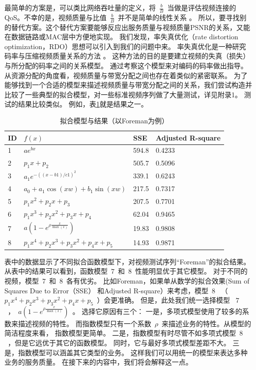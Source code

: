 \begin{enumerate}[(1)]
最简单的方案是，可以类比网络吞吐量的定义，将~$\frac{b}{B}$~当做是评估视频连接的QoS。不幸的是，视频质量与比值~$\frac{b}{B}$~并不是简单的线性关系
 \cite{He1013856}。
所以，要寻找别的替代方案。这个替代方案要能够反应出服务质量与视频质量PSNR的关系，又能在数据链路或MAC层中方便地实现。
我们发现，率失真优化（rate distortion optimization，RDO）思想可以引入到我们的问题中来。
率失真优化是一种研究码率与压缩视频质量关系的方法
\cite{He1013856}\cite{E-H-Yang.TIP.2007} \cite{J-Y-Liu.ICIP.2009} 。
这种方法的目的是要建立视频的失真（损失）与所分配的码率之间的关系模型。
通过考察这个模型来对编码的码率做出指导。
从资源分配的角度看，视频质量与带宽分配之间也存在着类似的紧密联系。
为了能够找到一个合适的模型来描述视频质量与带宽分配之间的关系，我们尝试构造并比较了一些典型的拟合模型，对一些标准视频序列做了大量测试，详见附录1。 测试的结果比较类似。 例如，表\ref{tb:chap_cacop:fit_functions}就是结果之一。
\begin{table}[tb]
\caption{拟合模型与结果（以Foreman为例）} 
\label{tb:chap_cacop:fit_functions}
\centering
\wuhao
\begin{tabularx}{0.99\linewidth}{p{}p{}p{}p{}}
\toprule
ID& $f(x)$ & SSE & Adjusted R-square\\
\midrule
1&$ae^{bx}$ & 594.8 &0.4233\\
2&$p_1 x + p_2$ & 505.7 & 0.5096\\
3&$a_1e^{-((x-b1)/c1)^2}$&339.1&0.6243\\
4&$a_0 + a_1\cos(xw) + b_1\sin(xw)$&217.5&0.7317\\
5&$p_1x^2 + p_2x + p_3$ &207.5 & 0.7701\\
6&$p_1x^3 + p_2x^2 + p_3x + p_4$&62.04&0.9465\\
7&$a(1-e^{ \rho \frac{x}{\max(x)}})$ &19.83 & 0.9808\\
8&$p_1x^4 + p_2x^3 + p_3x^2 + p_4x + p_5$&14.93 &0.9871\\
\bottomrule
\end{tabularx}
\end{table}
表中的数据显示了不同拟合函数模型下，对视频测试序列“Foreman”的拟合结果。
从表中的结果可以看到，函数模型~$7$~和~$8$~性能明显优于其它模型。
对于不同的视频，模型~$7$~和~$8$~各有优劣。
比如Foreman，如果单从数学的拟合效果(Sum of Squares Due to Error（SSE） 和Adjusted R-square）来考虑，模型~$8$~ （~$p_1x^4 + p_2x^3 + p_3x^2 + p_4x + p_5$~）会更准确。
但是，此处我们统一选择模型 ~$7$~，~$a(1-e^{ \rho \frac{x}{\max(x)}})$~。 
选择它原因有三个：
一是，多项式模型使用了较多的系数来描述视频的特性。
而指数模型只有一个系数~$\rho$~来描述业务的特性。从模型的简洁程度来看，
指数模型更简单。
二是，指数模型有时尽管不如多项式模型~$8$~，但是它远优于其它的函数模型。
同时，它与最好多项式模型差距不大。
三是，指数模型可以涵盖其它类型的业务。
这样我们可以用统一的模型来表达多种业务的服务质量。
在接下来的内容中，我们将会解释这一点。


\end{enumerate}
